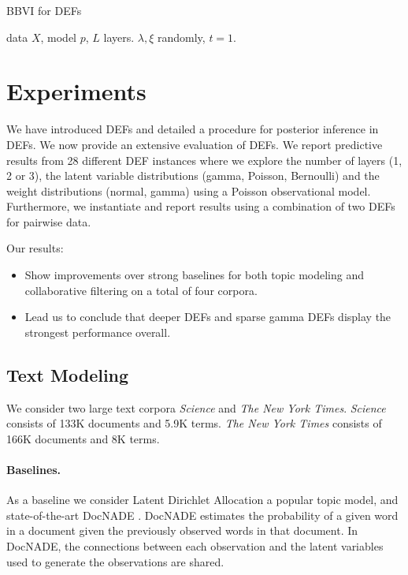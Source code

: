 \documentclass[twoside]{article}
\begin{document}
\begin{algorithm}[tb]
   \caption{BBVI for DEFs}
   \label{alg:def_small}
\begin{algorithmic}
  data $X$, model $p$, $L$ layers.
  $\lambda, \xi$ randomly, $t = 1$.
  \REPEAT
\ENDFOR
{}
\end{algorithmic}
\vskip -0.05in
\end{algorithm}

\section{Experiments}
\label{sec:Experiments}
We have introduced DEFs and detailed a procedure for posterior
inference in DEFs. We now provide an extensive evaluation of DEFs. 
We report predictive results from 28 different DEF instances where we explore
the number of layers (1, 2 or 3), the latent variable distributions (gamma,
Poisson, Bernoulli) and the weight distributions (normal, gamma) using a
Poisson observational model. Furthermore, we instantiate and report results
using a combination of two DEFs for pairwise data. 

Our results: 
\begin{itemize}[noitemsep,topsep=0pt,parsep=0pt,partopsep=0pt]
\item Show improvements over strong baselines for both topic modeling and
collaborative filtering on a total of four corpora. 
\item Lead us to conclude that deeper DEFs and sparse gamma DEFs display the
strongest performance overall.
\end{itemize}

\subsection{Text Modeling}

We consider two large text corpora  \emph{Science} and
\emph{The New York Times}. \emph{Science} consists of 133K
documents and 5.9K terms. \emph{The New York Times} consists
of 166K documents and 8K terms. 


\paragraph{Baselines.}
As a baseline we consider Latent Dirichlet Allocation \citep{Blei:2003} a
popular topic model, and state-of-the-art DocNADE \citep{Larochelle:2012}.
DocNADE estimates the probability of a given word in a document given the
previously observed words in that document. In DocNADE, the connections between
each observation and the latent variables used to generate the observations are
shared.
\end{document}
